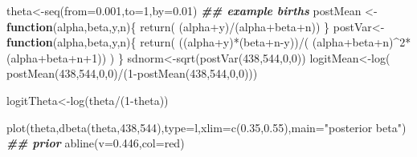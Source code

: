 \documentclass[
]{book}
\newenvironment{Shaded}{\begin{snugshade}}{\end{snugshade}}
\newcommand{\AttributeTok}[1]{\textcolor[rgb]{0.77,0.63,0.00}{#1}}
\newcommand{\ControlFlowTok}[1]{\textcolor[rgb]{0.13,0.29,0.53}{\textbf{#1}}}
\newcommand{\DecValTok}[1]{\textcolor[rgb]{0.00,0.00,0.81}{#1}}
\newcommand{\DocumentationTok}[1]{\textcolor[rgb]{0.56,0.35,0.01}{\textbf{\textit{#1}}}}
\newcommand{\FloatTok}[1]{\textcolor[rgb]{0.00,0.00,0.81}{#1}}
\newcommand{\FunctionTok}[1]{\textcolor[rgb]{0.00,0.00,0.00}{#1}}
\newcommand{\NormalTok}[1]{#1}
\newcommand{\OtherTok}[1]{\textcolor[rgb]{0.56,0.35,0.01}{#1}}
\newcommand{\SpecialCharTok}[1]{\textcolor[rgb]{0.00,0.00,0.00}{#1}}
\newcommand{\StringTok}[1]{\textcolor[rgb]{0.31,0.60,0.02}{#1}}
\theoremstyle{definition}
\theoremstyle{definition}
\theoremstyle{definition}
\theoremstyle{definition}
\theoremstyle{remark}
\begin{document}
\begin{Shaded}
\begin{Highlighting}[]
\NormalTok{  theta}\OtherTok{\textless{}{-}}\FunctionTok{seq}\NormalTok{(}\AttributeTok{from=}\FloatTok{0.001}\NormalTok{,}\AttributeTok{to=}\DecValTok{1}\NormalTok{,}\AttributeTok{by=}\FloatTok{0.01}\NormalTok{)}
  \DocumentationTok{\#\# example births}
\NormalTok{   postMean }\OtherTok{\textless{}{-}}\ControlFlowTok{function}\NormalTok{(alpha,beta,y,n)\{}
     \FunctionTok{return}\NormalTok{( (alpha}\SpecialCharTok{+}\NormalTok{y)}\SpecialCharTok{/}\NormalTok{(alpha}\SpecialCharTok{+}\NormalTok{beta}\SpecialCharTok{+}\NormalTok{n))}
\NormalTok{   \} }
\NormalTok{   postVar}\OtherTok{\textless{}{-}}\ControlFlowTok{function}\NormalTok{(alpha,beta,y,n)\{}
     \FunctionTok{return}\NormalTok{( ((alpha}\SpecialCharTok{+}\NormalTok{y)}\SpecialCharTok{*}\NormalTok{(beta}\SpecialCharTok{+}\NormalTok{n}\SpecialCharTok{{-}}\NormalTok{y))}\SpecialCharTok{/}\NormalTok{( (alpha}\SpecialCharTok{+}\NormalTok{beta}\SpecialCharTok{+}\NormalTok{n)}\SpecialCharTok{\^{}}\DecValTok{2}\SpecialCharTok{*}\NormalTok{(alpha}\SpecialCharTok{+}\NormalTok{beta}\SpecialCharTok{+}\NormalTok{n}\SpecialCharTok{+}\DecValTok{1}\NormalTok{)) )}
\NormalTok{   \}}
\NormalTok{   sdnorm}\OtherTok{\textless{}{-}}\FunctionTok{sqrt}\NormalTok{(}\FunctionTok{postVar}\NormalTok{(}\DecValTok{438}\NormalTok{,}\DecValTok{544}\NormalTok{,}\DecValTok{0}\NormalTok{,}\DecValTok{0}\NormalTok{))}
\NormalTok{   logitMean}\OtherTok{\textless{}{-}}\FunctionTok{log}\NormalTok{( }\FunctionTok{postMean}\NormalTok{(}\DecValTok{438}\NormalTok{,}\DecValTok{544}\NormalTok{,}\DecValTok{0}\NormalTok{,}\DecValTok{0}\NormalTok{)}\SpecialCharTok{/}\NormalTok{(}\DecValTok{1}\SpecialCharTok{{-}}\FunctionTok{postMean}\NormalTok{(}\DecValTok{438}\NormalTok{,}\DecValTok{544}\NormalTok{,}\DecValTok{0}\NormalTok{,}\DecValTok{0}\NormalTok{)))}
   
\NormalTok{  logitTheta}\OtherTok{\textless{}{-}}\FunctionTok{log}\NormalTok{(theta}\SpecialCharTok{/}\NormalTok{(}\DecValTok{1}\SpecialCharTok{{-}}\NormalTok{theta))}

  
    \FunctionTok{plot}\NormalTok{(theta,}\FunctionTok{dbeta}\NormalTok{(theta,}\DecValTok{438}\NormalTok{,}\DecValTok{544}\NormalTok{),}\AttributeTok{type=}\StringTok{\textquotesingle{}l\textquotesingle{}}\NormalTok{,}\AttributeTok{xlim=}\FunctionTok{c}\NormalTok{(}\FloatTok{0.35}\NormalTok{,}\FloatTok{0.55}\NormalTok{),}\AttributeTok{main=}\StringTok{"posterior beta"}\NormalTok{) }\DocumentationTok{\#\# prior}
    \FunctionTok{abline}\NormalTok{(}\AttributeTok{v=}\FloatTok{0.446}\NormalTok{,}\AttributeTok{col=}\StringTok{\textquotesingle{}red\textquotesingle{}}\NormalTok{)}
\end{Highlighting}
\end{Shaded}
\end{document}
